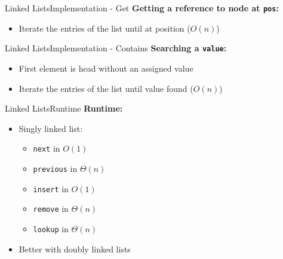 
\begin{frame}[fragile]{Linked Lists}{Implementation - Get}
  \textbf{Getting a reference to node at \texttt{pos}:}
  \begin{itemize}
    \item<3->
      Iterate the entries of the list until at position ($O(n)$)
      
  \end{itemize}
\end{frame}


\begin{frame}[fragile]{Linked Lists}{Implementation - Contains}
  \textbf{Searching a \texttt{value}:}
  \begin{itemize}
    \item<2->
      First element is head without an assigned value
    \item<3->
      Iterate the entries of the list until value found ($O(n)$)
      
  \end{itemize}
\end{frame}


\begin{frame}{Linked Lists}{Runtime}
  \textbf{Runtime:}
  \begin{itemize}
    \item<2->
      Singly linked list:
      \begin{itemize}
        \item<3-> {\color{Mittel-Blau}\texttt{next}} in $O(1)$
        \item<4-> {\color{Mittel-Blau}\texttt{previous}} in $\Theta(n)$
        \item<5-> {\color{Mittel-Blau}\texttt{insert}} in $O(1)$
        \item<6-> {\color{Mittel-Blau}\texttt{remove}} in $\Theta(n)$
        \item<7-> {\color{Mittel-Blau}\texttt{lookup}} in $\Theta(n)$
      \end{itemize}
    \item<8->
      Better with {\color{Mittel-Blau}doubly linked lists}
  \end{itemize}
\end{frame}


